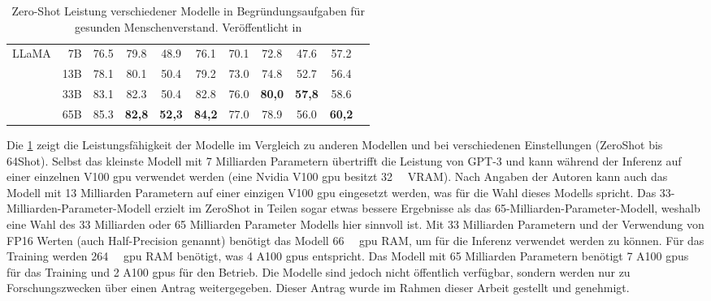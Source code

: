 \begin{table}[t!]
{\begin{tabular}{lrccccccccc}
            \midrule
            \multirow{4}{*}{LLaMA}
                       & 7B   & \SI{76,5}{}   & \SI{79,8}{}   & \SI{48,9}{}   & \SI{76,1}{}                               & \SI{70,1}{}                                & \SI{72,8}{}   & \SI{47,6}{}   & \SI{57,2}{}   \\
                       & 13B  & \SI{78,1}{}   & \SI{80,1}{}   & \SI{50,4}{}   & \SI{79,2}{}                               & \SI{73,0}{}                                & \SI{74,8}{}   & \SI{52,7}{}   & \SI{56,4}{}   \\
                       & 33B  & \SI{83,1}{}   & \SI{82,3}{}   & \SI{50,4}{}   & \SI{82,8}{}                               & \SI{76,0}{}                                & \textbf{80,0} & \textbf{57,8} & \SI{58,6}{}   \\
                       & 65B  & \SI{85,3}{}   & \textbf{82,8} & \textbf{52,3} & \textbf{84,2}                             & \SI{77,0}{}                                & \SI{78,9}{}   & \SI{56,0}{}   & \textbf{60,2} \\
            \bottomrule
        \end{tabular}}
    \caption[Zero-Shot Leistung verschiedener Modelle]{
        Zero-Shot Leistung verschiedener Modelle in Begründungsaufgaben für gesunden Menschenverstand.
        Veröffentlicht in \citet{llama}\label{tab:llama_naturalquestion}
    }
\end{table}

Die \cref{tab:llama_naturalquestion} zeigt die Leistungsfähigkeit der Modelle im Vergleich zu anderen Modellen und bei verschiedenen Einstellungen (ZeroShot bis 64Shot).
Selbst das kleinste Modell mit 7 Milliarden Parametern übertrifft die Leistung von GPT-3 und kann während der Inferenz auf einer einzelnen V100 \ac{gpu} verwendet werden (eine Nvidia V100 \ac{gpu} besitzt \SI{32}{\giga\byte} VRAM).
Nach Angaben der Autoren kann auch das Modell mit 13 Milliarden Parametern auf einer einzigen V100 \ac{gpu} eingesetzt werden, was für die Wahl dieses Modells spricht.
Das 33-Milliarden-Parameter-Modell erzielt im ZeroShot in Teilen sogar etwas bessere Ergebnisse als das 65-Milliarden-Parameter-Modell, weshalb eine Wahl des 33 Milliarden oder 65 Milliarden Parameter Modells hier sinnvoll ist.
Mit 33 Milliarden Parametern und der Verwendung von FP16 Werten (auch Half-Precision genannt) benötigt das Modell \SI{66}{\giga\byte} \ac{gpu} RAM, um für die Inferenz verwendet werden zu können.
Für das Training werden \SI{264}{\giga\byte} \ac{gpu} RAM benötigt, was 4 A100 \ac{gpu}s entspricht.
Das Modell mit 65 Milliarden Parametern benötigt 7 A100 \ac{gpu}s für das Training und 2 A100 \ac{gpu}s für den Betrieb.
Die Modelle sind jedoch nicht öffentlich verfügbar, sondern werden nur zu Forschungszwecken über einen Antrag weitergegeben.
Dieser Antrag wurde im Rahmen dieser Arbeit gestellt und genehmigt.\\


